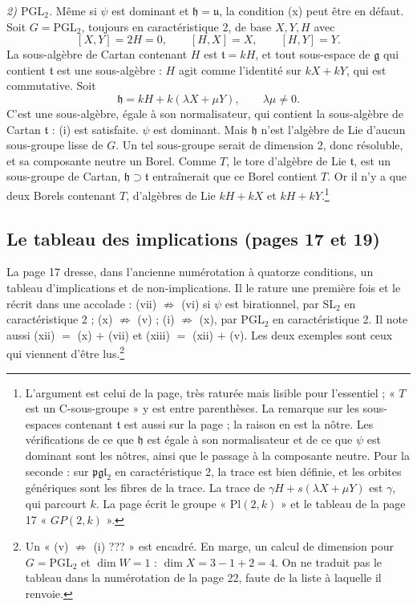 \documentclass[11pt,a4paper]{article}
\begin{document}
\emph{2) $\mathrm{PGL}_{2}$.} Même si $\psi$ est dominant et
$\mathfrak{h} = \mathfrak{u}$, la condition (x) peut être en défaut. Soit
$G = \mathrm{PGL}_{2}$, toujours en caractéristique 2, de base
$X, Y, H$ avec
\[
  [X, Y] = 2H = 0, \qquad [H, X] = X, \qquad [H, Y] = Y .
\]
La sous-algèbre de Cartan contenant $H$ est $\mathfrak{t} = kH$, et tout
sous-espace de $\mathfrak{g}$ qui contient $\mathfrak{t}$ est une
sous-algèbre : $H$ agit comme l'identité sur $kX + kY$, qui est commutative.
Soit
\[
  \mathfrak{h} = kH + k(\lambda X + \mu Y), \qquad \lambda \mu \neq 0 .
\]
C'est une sous-algèbre, égale à son normalisateur, qui contient la
sous-algèbre de Cartan $\mathfrak{t}$ : (i) est satisfaite. $\psi$ est
dominant. Mais $\mathfrak{h}$ n'est l'algèbre de Lie d'aucun sous-groupe lisse
de $G$. Un tel sous-groupe serait de dimension 2, donc résoluble, et sa
composante neutre un Borel. Comme $T$, le tore d'algèbre de Lie
$\mathfrak{t}$, est un sous-groupe de Cartan, $\mathfrak{h} \supset
\mathfrak{t}$ entraînerait que ce Borel contient $T$. Or il n'y a que deux
Borels contenant $T$, d'algèbres de Lie $kH + kX$ et $kH +
kY$.\footnote{L'argument est celui de la page, très raturée mais lisible
pour l'essentiel ; « $T$ est un C-sous-groupe » y est entre parenthèses. La
remarque sur les sous-espaces contenant $\mathfrak{t}$ est aussi sur la page ;
la raison en est la nôtre. Les vérifications de ce que $\mathfrak{h}$ est
égale à son normalisateur et de ce que $\psi$ est dominant sont les nôtres,
ainsi que le passage à la composante neutre. Pour la
seconde : sur $\mathfrak{pgl}_{2}$ en caractéristique 2, la trace est bien
définie, et les orbites génériques sont les fibres de la trace. La trace de
$\gamma H + s(\lambda X + \mu Y)$ est $\gamma$, qui parcourt $k$. La page
écrit le groupe « $\mathrm{Pl}(2, k)$ » et le tableau de la page 17
« $GP(2, k)$ ».}

\subsection*{Le tableau des implications (pages 17 et 19)}

La page 17 dresse, dans l'ancienne numérotation à quatorze conditions, un
tableau d'implications et de non-implications. Il le rature une première fois
et le récrit dans une accolade :
(vii) $\not\Rightarrow$ (vi) si $\psi$ est birationnel, par
$\mathrm{SL}_{2}$ en caractéristique 2 ; (x) $\not\Rightarrow$ (v) ;
(i) $\not\Rightarrow$ (x), par $\mathrm{PGL}_{2}$ en caractéristique 2. Il
note aussi (xii) $=$ (x) $+$ (vii) et (xiii) $=$ (xii) $+$ (v). Les deux
exemples sont ceux qui viennent d'être lus.\footnote{Un « (v) $\not\Rightarrow$
(i) ??? » est encadré. En marge, un calcul de dimension pour
$G = \mathrm{PGL}_{2}$ et $\dim W = 1$ : $\dim X = 3 - 1 + 2 = 4$. On ne
traduit pas le tableau dans la numérotation de la page 22, faute de la liste
à laquelle il renvoie.}
\end{document}

